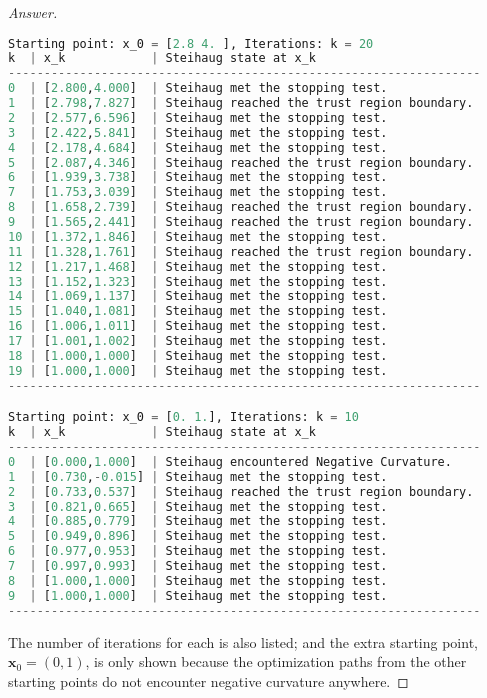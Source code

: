 \documentclass{article}
\begin{document}
\begin{proof}[Answer]
\begin{lstlisting}[language=python]
Starting point: x_0 = [2.8 4. ], Iterations: k = 20
k  | x_k            | Steihaug state at x_k
------------------------------------------------------------------
0  | [2.800,4.000]  | Steihaug met the stopping test.              
1  | [2.798,7.827]  | Steihaug reached the trust region boundary.  
2  | [2.577,6.596]  | Steihaug met the stopping test.              
3  | [2.422,5.841]  | Steihaug met the stopping test.              
4  | [2.178,4.684]  | Steihaug met the stopping test.              
5  | [2.087,4.346]  | Steihaug reached the trust region boundary.  
6  | [1.939,3.738]  | Steihaug met the stopping test.              
7  | [1.753,3.039]  | Steihaug met the stopping test.              
8  | [1.658,2.739]  | Steihaug reached the trust region boundary.  
9  | [1.565,2.441]  | Steihaug reached the trust region boundary.  
10 | [1.372,1.846]  | Steihaug met the stopping test.              
11 | [1.328,1.761]  | Steihaug reached the trust region boundary.  
12 | [1.217,1.468]  | Steihaug met the stopping test.              
13 | [1.152,1.323]  | Steihaug met the stopping test.              
14 | [1.069,1.137]  | Steihaug met the stopping test.              
15 | [1.040,1.081]  | Steihaug met the stopping test.              
16 | [1.006,1.011]  | Steihaug met the stopping test.              
17 | [1.001,1.002]  | Steihaug met the stopping test.              
18 | [1.000,1.000]  | Steihaug met the stopping test.              
19 | [1.000,1.000]  | Steihaug met the stopping test.              
------------------------------------------------------------------

Starting point: x_0 = [0. 1.], Iterations: k = 10
k  | x_k            | Steihaug state at x_k
------------------------------------------------------------------
0  | [0.000,1.000]  | Steihaug encountered Negative Curvature.     
1  | [0.730,-0.015] | Steihaug met the stopping test.              
2  | [0.733,0.537]  | Steihaug reached the trust region boundary.  
3  | [0.821,0.665]  | Steihaug met the stopping test.              
4  | [0.885,0.779]  | Steihaug met the stopping test.              
5  | [0.949,0.896]  | Steihaug met the stopping test.              
6  | [0.977,0.953]  | Steihaug met the stopping test.              
7  | [0.997,0.993]  | Steihaug met the stopping test.              
8  | [1.000,1.000]  | Steihaug met the stopping test.              
9  | [1.000,1.000]  | Steihaug met the stopping test.              
------------------------------------------------------------------
\end{lstlisting}
        The number of iterations for each is also listed; and the extra 
        starting point, $\bm{x}_0 = (0,1)$, is only shown because the 
        optimization paths from the other starting points do not encounter
        negative curvature anywhere.
        \end{proof}
\end{document}
